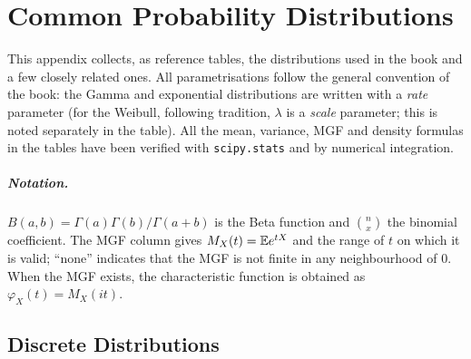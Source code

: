 \documentclass[main.tex]{subfiles}
\begin{document}
\chapter{Common Probability Distributions}\label{ek:dagilimlar}

This appendix collects, as reference tables, the distributions used in the book and a few closely related ones. All parametrisations follow the general convention of the book: the Gamma and exponential distributions are written with a \emph{rate} parameter (for the Weibull, following tradition, $\lambda$ is a \emph{scale} parameter; this is noted separately in the table). All the mean, variance, MGF and density formulas in the tables have been verified with \texttt{scipy.stats} and by numerical integration.

\paragraph{Notation.} $B(a,b)=\Gamma(a)\Gamma(b)/\Gamma(a+b)$ is the Beta function and $\binom{n}{x}$ the binomial coefficient. The MGF column gives $M_X(t)=\mathbb{E} e^{tX}$ and the range of $t$ on which it is valid; ``none'' indicates that the MGF is not finite in any neighbourhood of $0$. When the MGF exists, the characteristic function is obtained as $\varphi_X(t)=M_X(it)$.

\section{Discrete Distributions}
\end{document}
